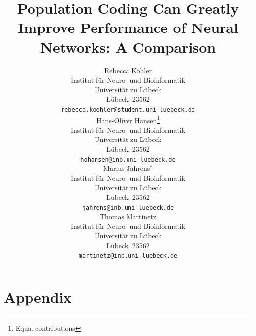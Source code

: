 \documentclass{article}
\title{Population Coding Can Greatly Improve Performance of Neural Networks: A Comparison}
\author{%
Rebecca K\"ohler\\
Institut für Neuro- und Bioinformatik\\
Universität zu Lübeck\\
Lübeck, 23562 \\
\texttt{rebecca.koehler@student.uni-luebeck.de} \\
\And
Hans-Oliver Hansen\thanks{Equal contributions} \\
Institut für Neuro- und Bioinformatik\\
Universität zu Lübeck\\
Lübeck, 23562 \\
\texttt{hohansen@inb.uni-luebeck.de} \\
\And
Marius Jahrens$^*$ \\
Institut für Neuro- und Bioinformatik\\
Universität zu Lübeck\\
Lübeck, 23562 \\
\texttt{jahrens@inb.uni-luebeck.de} \\
\And
Thomas Martinetz \\
Institut für Neuro- und Bioinformatik\\
Universität zu Lübeck\\
Lübeck, 23562 \\
\texttt{martinetz@inb.uni-luebeck.de} \\
}
\begin{document}
\maketitle


\begin{abstract}
  
\end{abstract}














\newpage
\appendix


\section{Appendix}
\end{document}
